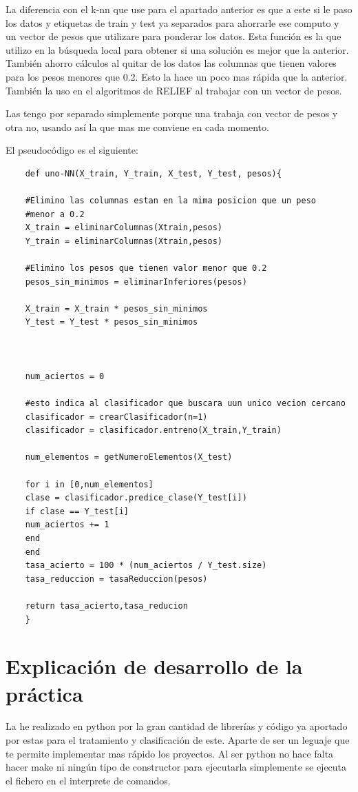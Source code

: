 \documentclass[titlepage]{article}
\begin{document}
	
	La diferencia con el k-nn que use para el apartado anterior es que a este si le paso los datos y etiquetas de train y test ya separados para ahorrarle ese computo y un vector de pesos que utilizare para ponderar los datos. Esta función es la que utilizo en la búsqueda local para obtener si una solución es mejor que la anterior. También ahorro cálculos al quitar de los datos las columnas que tienen valores para los pesos menores que 0.2. Esto la hace un poco mas rápida que la anterior. También la uso en el algoritmos de RELIEF al trabajar con un vector de pesos. 
	
	Las tengo por separado simplemente porque una trabaja con vector de pesos y otra no, usando así la que mas me conviene en cada momento.
	
	El pseudocódigo es el siguiente:

	
	\begin{lstlisting}
	def uno-NN(X_train, Y_train, X_test, Y_test, pesos){
	
	#Elimino las columnas estan en la mima posicion que un peso 
	#menor a 0.2
	X_train = eliminarColumnas(Xtrain,pesos)
	Y_train = eliminarColumnas(Xtrain,pesos)
	
	#Elimino los pesos que tienen valor menor que 0.2
	pesos_sin_minimos = eliminarInferiores(pesos)
	
	X_train = X_train * pesos_sin_minimos
	Y_test = Y_test * pesos_sin_minimos
	
	
	
	num_aciertos = 0
	
	#esto indica al clasificador que buscara uun unico vecion cercano
	clasificador = crearClasificador(n=1)
	clasificador = clasificador.entreno(X_train,Y_train)
	
	num_elementos = getNumeroElementos(X_test)
	
	for i in [0,num_elementos]
	clase = clasificador.predice_clase(Y_test[i])
	if clase == Y_test[i]
	num_aciertos += 1
	end
	end
	tasa_acierto = 100 * (num_aciertos / Y_test.size)
	tasa_reduccion = tasaReduccion(pesos)
	
	return tasa_acierto,tasa_reducion
	}
	\end{lstlisting}
	
	\section{Explicación de desarrollo de la práctica}
	La he realizado en python por la gran cantidad de librerías y código ya aportado por estas para el tratamiento y clasificación de este.
	Aparte de ser un leguaje que te permite implementar mas rápido los proyectos.
	Al ser python no hace falta hacer make ni ningún tipo de constructor para ejecutarla simplemente se ejecuta el fichero en el interprete de comandos.
	
\end{document}

